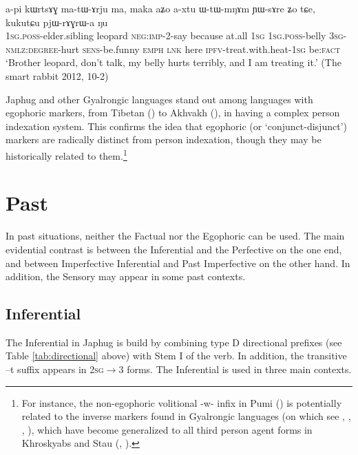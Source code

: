 \documentclass[oldfontcommands,oneside,a4paper,11pt]{article}
\newcommand{\ipa}[1]{{\phon \mbox{#1}}} %
\newcommand{\factual}[1]{\textsc{:fact}}
\begin{document}
 \begin{exe}
\ex \label{ex:pjWrAGrWa}
\gll
 \ipa{a-pi} 	\ipa{kɯrtsɤɣ} 	\ipa{ma-tɯ-ɤrju} 	\ipa{ma,} 	\ipa{maka} 	\ipa{aʑo} 	\ipa{a-xtu} 	\ipa{ɯ-tɯ-mŋɤm} 	\ipa{ɲɯ-sɤre} 	\ipa{ʑo} 	\ipa{tɕe,} 	\ipa{kukutɕu} 	\ipa{pjɯ-rɤɣrɯ-a} 	\ipa{ŋu} 	\\
 \textsc{1sg.poss}-elder.sibling leopard \textsc{neg:imp}-2-say because at.all \textsc{1sg} \textsc{1sg.poss}-belly \textsc{3sg-nmlz:degree}-hurt \textsc{sens}-be.funny \textsc{emph} \textsc{lnk} here \textsc{ipfv}-treat.with.heat-\textsc{1sg} be\factual{}  \\
\glt `Brother leopard, don't talk, my belly hurts terribly, and I am treating it.' (The smart rabbit 2012, 10-2)
 \end{exe}
 
Japhug and other Gyalrongic languages stand out among languages with egophoric markers, from Tibetan (\citealt{tournadre08conjunct}) to Akhvakh (\citealt{creissels08akhvakh}), in having  a complex person indexation system. This confirms the idea that egophoric (or `conjunct-disjunct') markers are radically distinct from person indexation, though they may be historically related to them.\footnote{For instance, the non-egophoric volitional \ipa{-w-} infix in Pumi (\citealt{daudey14volition}) is potentially related to the inverse markers found in Gyalrongic languages (on which see \citealt{delancey81direction}, \citealt{jackson02rentongdengdi}, \citealt{jacques10inverse}, \citealt{gongxun14agreement}), which have become generalized to all third person agent forms in Khroskyabs and Stau (\citealt{jacques14rtau}, \citealt{lai14person}).}

 
\section{Past} \label{sec:evd:pst}
In past situations, neither the Factual nor the Egophoric  can be used. The main evidential contrast is between the Inferential and the Perfective on the one end, and between Imperfective Inferential and Past Imperfective on the other hand. In addition, the Sensory may appear in some past contexts.


\subsection{Inferential}  \label{sec:ifr}
The Inferential in Japhug is build by combining type D directional prefixes (see Table \ref{tab:directional} above) with Stem I of the verb. In addition, the transitive \ipa{--t} suffix appears in \textsc{2sg}$\rightarrow$3 forms. The Inferential is used in three main contexts. 
\end{document}
